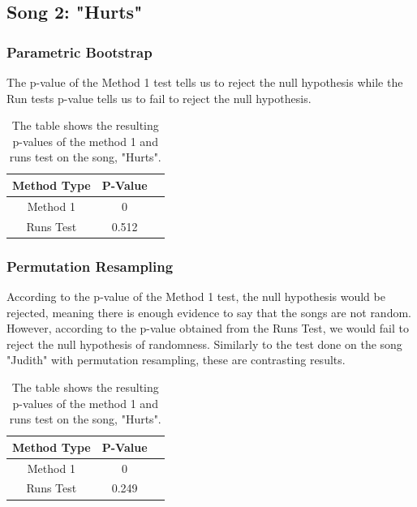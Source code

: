 \documentclass[12pt, letterpaper]{article}
\begin{document}
\subsection{Song 2: "Hurts"}
\subsubsection{Parametric Bootstrap}
The p-value of the Method 1 test tells us to reject the null hypothesis while the Run tests p-value tells us to fail to reject the null hypothesis.
\begin{table}[h]
\begin{center}
\begin{tabular}{|c|c|c|}
\hline
\textbf{Method Type} & P-Value \\
\hline
Method 1 & 0  \\
\hline
Runs Test & 0.512 \\ 
\hline
\end{tabular} 
\end{center}
\caption{The table shows the resulting p-values of the method 1 and runs test on the song, "Hurts".}
\label{fig: P-values for "Hurts": Parametric Bootstrap}
\end{table}

\subsubsection{Permutation Resampling}
According to the p-value of the Method 1 test, the null hypothesis would be rejected, meaning there is enough evidence to say that the songs are not random. However, according to the p-value obtained from the Runs Test, we would fail to reject the null hypothesis of randomness. Similarly to the test done on the song "Judith" with permutation resampling, these are contrasting results.
\begin{table}[h]
\begin{center}
\begin{tabular}{|c|c|c|}
\hline
\textbf{Method Type} & P-Value \\
\hline
Method 1 & 0  \\
\hline
Runs Test & 0.249 \\ 
\hline
\end{tabular}
\end{center}
\caption{The table shows the resulting p-values of the method 1 and runs test on the song, "Hurts".}
\label{fig: P-values for "Hurts":Permutation Resampling}
\end{table}
\end{document}
